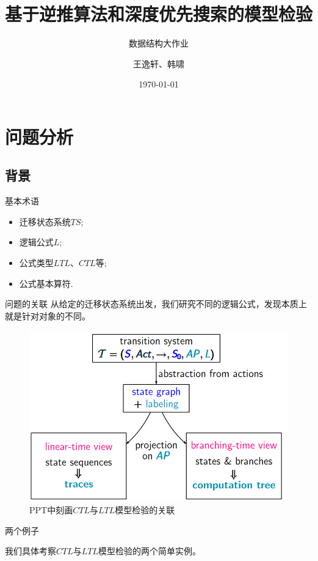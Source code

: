 \documentclass[english]{pkuslide}
\title[模型检验]{基于逆推算法和深度优先搜索的模型检验}
\subtitle{数据结构大作业}
\institute{北京大学数学科学学院}
\author{王逸轩、韩啸}
\date{\today}
\begin{document}
	\begin{frame}
\titlepage
	\end{frame}

	\begin{frame}
\tableofcontents[subsectionstyle=show]
	\end{frame}

\section{问题分析}
\frame{\sectionpage}
\subsection{背景}
\begin{frame}{基本术语}
\begin{itemize}[<+->]
\item 迁移状态系统$TS$;
\item 逻辑公式$L$;
\item 公式类型$LTL$、$CTL$等;
\item 公式基本算符.
\end{itemize}
\end{frame}
\begin{frame}{问题的关联}
从给定的迁移状态系统出发，我们研究不同的逻辑公式，发现本质上就是针对对象的不同。
\begin{figure}
\centering
\includegraphics[height=0.5\textheight]{1.png}
\caption{PPT中刻画$CTL$与$LTL$模型检验的关联}
\end{figure}
\end{frame}
\begin{frame}{两个例子}
\centering
\begin{alertblock}{我们具体考察$CTL$与$LTL$模型检验的两个简单实例。}
\end{alertblock}
\end{frame}
\begin{quoteslide}

\end{quoteslide}
\begin{quoteslide}

\end{quoteslide}
\end{document}

